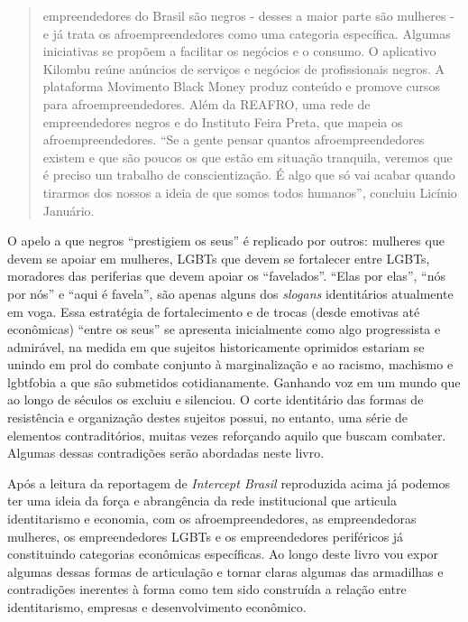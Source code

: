 \begin{quote}
empreendedores do Brasil são negros - desses a maior parte são mulheres
- e já trata os afroempreendedores como uma categoria específica.
Algumas iniciativas se propõem a facilitar os negócios e o consumo. O
aplicativo Kilombu reúne anúncios de serviços e negócios de
profissionais negros. A plataforma Movimento Black Money produz conteúdo
e promove cursos para afroempreendedores. Além da REAFRO, uma rede de
empreendedores negros e do Instituto Feira Preta, que mapeia os
afroempreendedores. ``Se a gente pensar quantos afroempreendedores
existem e que são poucos os que estão em situação tranquila, veremos que
é preciso um trabalho de conscientização. É algo que só vai acabar
quando tirarmos dos nossos a ideia de que somos todos humanos'',
concluiu Licínio Januário.
\end{quote}

O apelo a que negros ``prestigiem os seus'' é replicado por outros:
mulheres que devem se apoiar em mulheres, LGBTs que devem se fortalecer
entre LGBTs, moradores das periferias que devem apoiar os ``favelados''.
``Elas por elas'', ``nós por nós'' e ``aqui é favela'', são apenas
alguns dos \emph{slogans} identitários atualmente em voga. Essa
estratégia de fortalecimento e de trocas (desde emotivas até econômicas)
``entre os seus'' se apresenta inicialmente como algo progressista e
admirável, na medida em que sujeitos historicamente oprimidos estariam
se unindo em prol do combate conjunto à marginalização e ao racismo,
machismo e lgbtfobia a que são submetidos cotidianamente. Ganhando voz
em um mundo que ao longo de séculos os excluiu e silenciou. O corte
identitário das formas de resistência e organização destes sujeitos
possui, no entanto, uma série de elementos contraditórios, muitas vezes
reforçando aquilo que buscam combater. Algumas dessas contradições serão
abordadas neste livro.

Após a leitura da reportagem de \emph{Intercept Brasil} reproduzida
acima já podemos ter uma ideia da força e abrangência da rede
institucional que articula identitarismo e economia, com os
afroempreendedores, as empreendedoras mulheres, os empreendedores LGBTs
e os empreendedores periféricos já constituindo categorias econômicas
específicas. Ao longo deste livro vou expor algumas dessas formas de
articulação e tornar claras algumas das armadilhas e contradições
inerentes à forma como tem sido construída a relação entre
identitarismo, empresas e desenvolvimento econômico.

